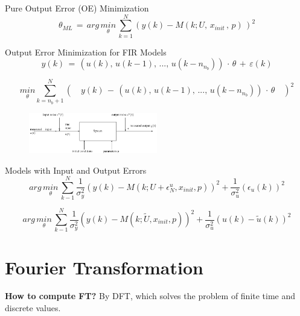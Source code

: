Pure Output Error (OE) Minimization
\begin{equation*}
\theta _{ ML } \, =\, arg\, \underset { \theta  }{ min } \, \sum _{ k=1 }^{ N }{ (y(k)-M(k;U,\, x_{ init }\, ,\, p)\, )^{ 2 } }
\end{equation*}

Output Error Minimization for FIR Models
\begin{equation*}
y(k) \, = \, (u(k),\, u(k-1),\, ...,\, u(k-n_{n_b})) \, \cdot \, \theta \, + \, \varepsilon(k)
\end{equation*}

\begin{equation*}
\underset { \theta  }{ min } \sum _{ k=n_{ b }+1 }^{ N }{ (\quad y(k)\, -\, (u(k),\, u(k-1),\, ...,\, u(k-n_{ n_{ b } }))\, \cdot \, \theta \quad )^{ 2 } } 
\end{equation*}


\begin{figure}[H]
	\centering
  	\includegraphics[width=0.5\textwidth]{./model.pdf}
	\label{model}
\end{figure}
Models with Input and Output Errors
\begin{equation*}
arg \, \underset { \theta  }{ min } \, \sum _{ k-1 }^{ N }{ \frac { 1 }{ { \sigma  }_{ y }^{ 2 } }  } { (y(k)-M(k;U+{ \epsilon  }_{ N }^{ u },{ x }_{ init },p)) }^{ 2 }+\frac { 1 }{ { \sigma  }_{ u }^{ 2 } } { ({ \epsilon  }_{ u }(k)) }^{ 2 }
\end{equation*}


\begin{equation*}
arg \, \underset { \theta  }{ min } \, \sum _{ k-1 }^{ N }{ \frac { 1 }{ { \sigma  }_{ y }^{ 2 } }  } { (y(k)-M(k;\tilde { U } ,{ x }_{ init },p)) }^{ 2 }+\frac { 1 }{ { \sigma  }_{ u }^{ 2 } } { (u(k)-\tilde{ u }(k) ) }^{ 2 }
\end{equation*}





\newpage
\section*{Fourier Transformation}
\textbf{How to compute FT?} By DFT, which solves the problem of finite time and discrete values.

